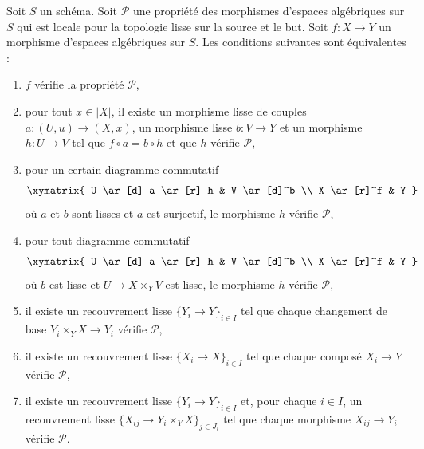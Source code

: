 \begin{lemma}
\label{lemma-local-source-target-characterize}
Soit $S$ un schéma.
Soit $\mathcal{P}$ une propriété des morphismes d'espaces algébriques sur $S$
qui est locale pour la topologie lisse sur la source et le but. Soit $f : X \to Y$ un morphisme
d'espaces algébriques sur $S$. Les conditions suivantes sont équivalentes :
\begin{enumerate}
\item[(a)] $f$ vérifie la propriété $\mathcal{P}$,
\item[(b)] pour tout $x \in |X|$, il existe un morphisme lisse de couples
$a : (U, u) \to (X, x)$, un morphisme lisse $b : V \to Y$ et
un morphisme $h : U \to V$ tel que $f \circ a = b \circ h$ et que
$h$ vérifie $\mathcal{P}$,
\item[(c)] pour un certain diagramme commutatif
$$
\xymatrix{
U \ar[d]_a \ar[r]_h & V \ar[d]^b \\
X \ar[r]^f & Y
}
$$
où $a$ et $b$ sont lisses et $a$ est surjectif, le morphisme $h$ vérifie $\mathcal{P}$,
\item[(d)] pour tout diagramme commutatif
$$
\xymatrix{
U \ar[d]_a \ar[r]_h & V \ar[d]^b \\
X \ar[r]^f & Y
}
$$
où $b$ est lisse et $U \to X \times_Y V$ est lisse,
le morphisme $h$ vérifie $\mathcal{P}$,
\item[(e)] il existe un recouvrement lisse $\{Y_i \to Y\}_{i \in I}$ tel
que chaque changement de base $Y_i \times_Y X \to Y_i$ vérifie $\mathcal{P}$,
\item[(f)] il existe un recouvrement lisse $\{X_i \to X\}_{i \in I}$ tel
que chaque composé $X_i \to Y$ vérifie $\mathcal{P}$,
\item[(g)] il existe un recouvrement lisse $\{Y_i \to Y\}_{i \in I}$ et,
pour chaque $i \in I$, un recouvrement lisse
$\{X_{ij} \to Y_i \times_Y X\}_{j \in J_i}$ tel que chaque morphisme
$X_{ij} \to Y_i$ vérifie $\mathcal{P}$.
\end{enumerate}
\end{lemma}

